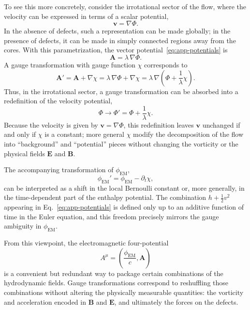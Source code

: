 \documentclass[11pt]{article}
\begin{document}
To see this more concretely, consider the irrotational sector of the flow, where the velocity can be expressed in terms of a scalar potential,
\begin{equation}
\mathbf{v} = \nabla \Phi.
\end{equation}
In the absence of defects, such a representation can be made globally; in the presence of defects, it can be made in simply connected regions away from the cores.  With this parametrization, the vector potential~\eqref{eq:app-potentials} is
\begin{equation}
\mathbf{A} = \lambda\,\nabla \Phi.
\end{equation}
A gauge transformation with gauge function $\chi$ corresponds to
\begin{equation}
\mathbf{A}' = \mathbf{A} + \nabla\chi
= \lambda\,\nabla \Phi + \nabla\chi
= \lambda\,\nabla\left(\Phi + \frac{1}{\lambda}\chi\right).
\end{equation}
Thus, in the irrotational sector, a gauge transformation can be absorbed into a redefinition of the velocity potential,
\begin{equation}
\Phi \rightarrow \Phi' = \Phi + \frac{1}{\lambda}\chi.
\end{equation}
Because the velocity is given by $\mathbf{v} = \nabla\Phi$, this redefinition leaves $\mathbf{v}$ unchanged if and only if $\chi$ is a constant; more general $\chi$ modify the decomposition of the flow into ``background'' and ``potential'' pieces without changing the vorticity or the physical fields $\mathbf{E}$ and $\mathbf{B}$.

The accompanying transformation of $\phi_{\mathrm{EM}}$,
\begin{equation}
\phi_{\mathrm{EM}}' = \phi_{\mathrm{EM}} - \partial_t \chi,
\end{equation}
can be interpreted as a shift in the local Bernoulli constant or, more generally, in the time-dependent part of the enthalpy potential.  The combination $h + \frac{1}{2}v^2$ appearing in Eq.~\eqref{eq:app-potentials} is defined only up to an additive function of time in the Euler equation, and this freedom precisely mirrors the gauge ambiguity in $\phi_{\mathrm{EM}}$.

From this viewpoint, the electromagnetic four-potential
\begin{equation}
A^\mu = \left(\frac{\phi_{\mathrm{EM}}}{c},\mathbf{A}\right)
\end{equation}
is a convenient but redundant way to package certain combinations of the hydrodynamic fields.  Gauge transformations correspond to reshuffling those combinations without altering the physically measurable quantities: the vorticity and acceleration encoded in $\mathbf{B}$ and $\mathbf{E}$, and ultimately the forces on the defects.
\end{document}
